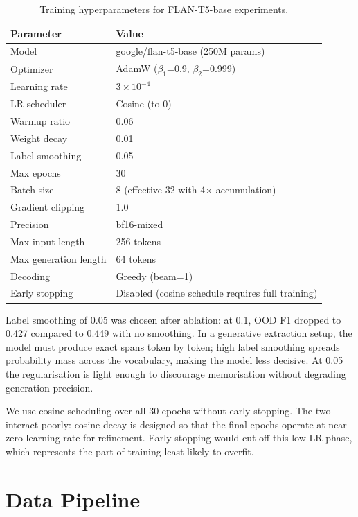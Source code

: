 \documentclass[12pt,a4paper]{report}
\begin{document}
\begin{table}[htbp]
\centering
\caption{Training hyperparameters for FLAN-T5-base experiments.}
\label{tab:hyperparams}
\small
\begin{tabular}{@{}ll@{}}
\toprule
\textbf{Parameter} & \textbf{Value} \\
\midrule
Model & google/flan-t5-base (250M params) \\
Optimizer & AdamW ($\beta_1$=0.9, $\beta_2$=0.999) \\
Learning rate & $3 \times 10^{-4}$ \\
LR scheduler & Cosine (to 0) \\
Warmup ratio & 0.06 \\
Weight decay & 0.01 \\
Label smoothing & 0.05 \\
Max epochs & 30 \\
Batch size & 8 (effective 32 with 4$\times$ accumulation) \\
Gradient clipping & 1.0 \\
Precision & bf16-mixed \\
Max input length & 256 tokens \\
Max generation length & 64 tokens \\
Decoding & Greedy (beam=1) \\
Early stopping & Disabled (cosine schedule requires full training) \\
\bottomrule
\end{tabular}
\end{table}

Label smoothing of 0.05 was chosen after ablation: at 0.1, OOD F1 dropped to 0.427 compared to 0.449 with no smoothing. In a generative extraction setup, the model must produce exact spans token by token; high label smoothing spreads probability mass across the vocabulary, making the model less decisive. At 0.05 the regularisation is light enough to discourage memorisation without degrading generation precision.

We use cosine scheduling over all 30 epochs without early stopping. The two interact poorly: cosine decay is designed so that the final epochs operate at near-zero learning rate for refinement. Early stopping would cut off this low-LR phase, which represents the part of training least likely to overfit.


\section{Data Pipeline}
\end{document}
